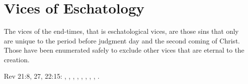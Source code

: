 \section{Vices of Eschatology}

The vices of the end-times, that is eschatological vices, are those sins that only are unique to the period before judgment day and the second coming of Christ. Those have been enumerated safely to exclude other vices that are eternal to the creation.

Rev 21:8, 27, 22:15:
,
,
,
,
,
,
,
,
.
